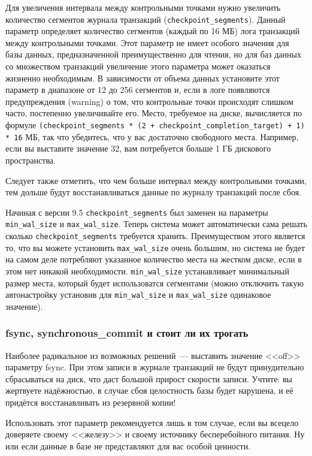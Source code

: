 Для увеличения интервала между контрольными точками нужно увеличить количество сегментов журнала транзакций (\lstinline!checkpoint_segments!). Данный параметр определяет количество сегментов (каждый по 16 МБ) лога транзакций между контрольными точками. Этот параметр не имеет особого значения для базы данных, предназначенной преимущественно для чтения, но для баз данных со множеством транзакций увеличение этого параметра может оказаться жизненно необходимым. В зависимости от объема данных установите этот параметр в диапазоне от 12 до 256 сегментов и, если в логе появляются предупреждения (warning) о том, что контрольные точки происходят слишком часто, постепенно увеличивайте его. Место, требуемое на диске, вычисляется по формуле \lstinline!(checkpoint_segments * (2 + checkpoint_completion_target) + 1) * 16! МБ, так что убедитесь, что у вас достаточно свободного места. Например, если вы выставите значение 32, вам потребуется больше 1 ГБ дискового пространства.

Следует также отметить, что чем больше интервал между контрольными точками, тем дольше будут восстанавливаться данные по журналу транзакций после сбоя.

Начиная с версии 9.5 \lstinline!checkpoint_segments! был заменен на параметры \lstinline!min_wal_size! и \lstinline!max_wal_size!. Теперь система может автоматически сама решать сколько \lstinline!checkpoint_segments! требуется хранить. Преимуществом этого является то, что вы можете установить \lstinline!max_wal_size! очень большим, но система не будет на самом деле потребляют указанное количество места на жестком диске, если в этом нет никакой необходимости. \lstinline!min_wal_size! устанавливает минимальный размер места, который будет использоватся сегментами (можно отключить такую автонастройку установив для \lstinline!min_wal_size! и \lstinline!max_wal_size! одинаковое значение).


\subsubsection{fsync, synchronous\_commit и стоит ли их трогать}


Наиболее радикальное из возможных решений~--- выставить значение <<off>> параметру fsync. При этом записи в журнале транзакций не будут принудительно сбрасываться на диск, что даст большой прирост скорости записи. Учтите: вы жертвуете надёжностью, в случае сбоя целостность базы будет нарушена, и её придётся восстанавливать из резервной копии!

Использовать этот параметр рекомендуется лишь в том случае, если вы всецело доверяете своему <<железу>> и своему источнику бесперебойного питания. Ну или если данные в базе не представляют для вас особой ценности.

